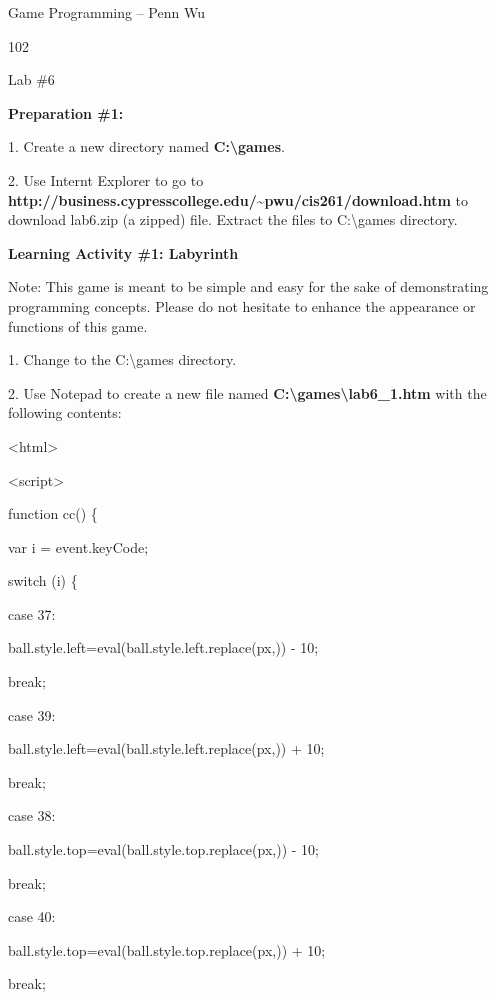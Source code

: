 \documentclass[
]{article}
\begin{document}
Game Programming -- Penn Wu

102

\protect\hypertarget{index_split_007.htmlux5cux23p103}{}{}

Lab \#6

\textbf{Preparation \#1:}

1. Create a new directory named \textbf{C:\textbackslash games}.

2. Use Internt Explorer to go to
\textbf{http://business.cypresscollege.edu/\textasciitilde pwu/cis261/download.htm}
to download lab6.zip (a zipped) file. Extract the files to
C:\textbackslash games directory.

\textbf{Learning Activity \#1: Labyrinth}

Note: This game is meant to be simple and easy for the sake of
demonstrating programming concepts. Please do not hesitate to enhance
the appearance or functions of this game.

1. Change to the C:\textbackslash games directory.

2. Use Notepad to create a new file named
\textbf{C:\textbackslash games\textbackslash lab6\_1.htm} with the
following contents:

\textless html\textgreater{}

\textless script\textgreater{}

function cc() \{

var i = event.keyCode;

switch (i) \{

case 37:

ball.style.left=eval(ball.style.left.replace(\textquotesingle px\textquotesingle,\textquotesingle\textquotesingle))
- 10;

break;

case 39:

ball.style.left=eval(ball.style.left.replace(\textquotesingle px\textquotesingle,\textquotesingle\textquotesingle))
+ 10;

break;

case 38:

ball.style.top=eval(ball.style.top.replace(\textquotesingle px\textquotesingle,\textquotesingle\textquotesingle))
- 10;

break;

case 40:

ball.style.top=eval(ball.style.top.replace(\textquotesingle px\textquotesingle,\textquotesingle\textquotesingle))
+ 10;

break;
\end{document}
